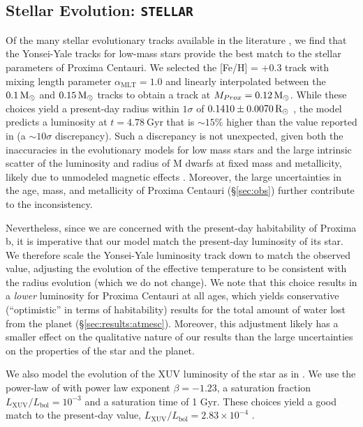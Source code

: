 \documentclass[preprint,12pt]{aastex}
\newcommand{\xxx}[1]{{\color{red} #1}} %
\def\msun{{\rm\,M_\odot}}
\def\rsun{{\rm\,R_\odot}}
\def\eg{{\it e.g.\ }}
\def\stellar{\texttt{\footnotesize{STELLAR}}\xspace}
\begin{document}
\subsection{Stellar Evolution: \stellar}
\label{sec:models:stellar}

Of the many stellar evolutionary tracks available in the literature
\citep[\eg][]{Baraffe98,Dartmouth08,Baraffe15}, we find that the
Yonsei-Yale tracks for low-mass stars \citep{YonseiYale13} provide the
best match to the stellar parameters of Proxima Centauri. We selected
the [Fe/H] = +0.3 track with mixing length parameter
$\alpha_\mathrm{MLT} = 1.0$ and linearly interpolated between the $0.1
\msun$ and $0.15 \msun$ tracks to obtain a track at $M_{Prox} = 0.12
\msun$.  While these choices yield a present-day radius within
$1\sigma$ of $0.1410 \pm 0.0070 \rsun$ \citep{Boyajian12}, the model
predicts a luminosity at $t = 4.78\ \mathrm{Gyr}$ that is $\sim 15\%$
higher than the value reported in \cite{Boyajian12} (a $\sim 10\sigma$
discrepancy). Such a discrepancy is not unexpected, given both the
inaccuracies in the evolutionary models for low mass stars and the
large intrinsic scatter of the luminosity and radius of M dwarfs at
fixed mass and metallicity, likely due to unmodeled magnetic effects
\citep{YonseiYale13}. Moreover, the large uncertainties in the age,
mass, and metallicity of Proxima Centauri (\S\ref{sec:obs}) further
contribute to the inconsistency.

Nevertheless, since we are concerned with the present-day habitability
of Proxima b, it is imperative that our model match the present-day
luminosity of its star. We therefore scale the Yonsei-Yale luminosity
track down to match the observed value, adjusting the evolution of the
effective temperature to be consistent with the radius evolution
(which we do not change). We note that this choice results in a
\emph{lower} luminosity for Proxima Centauri at all ages, which yields
conservative (``optimistic'' \xxx{in terms of habitability}) results for the total amount of water
lost from the planet (\S\ref{sec:results:atmesc}). Moreover, this
adjustment likely has a smaller effect on the qualitative nature of
our results than the large uncertainties on the properties of the star
and the planet.

We also model the evolution of the XUV luminosity of the star as in
\cite{LugerBarnes15}. We use the power-law of \cite{Ribas05} with
power law exponent $\beta = -1.23$, a saturation fraction
$L_\mathrm{XUV}/L_\mathrm{bol} = 10^{-3}$ and a saturation time of 1
Gyr. These choices yield a good match to the present-day value,
$L_\mathrm{XUV}/L_\mathrm{bol} = 2.83\times 10^{-4}$
\citep{Boyajian12}.
\end{document}
